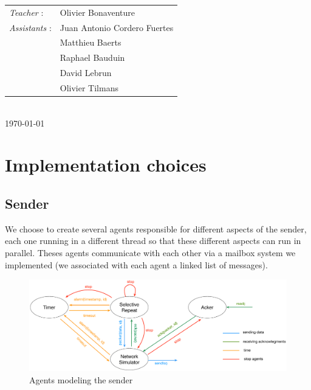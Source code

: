 \documentclass[11pt,a4paper]{article}
\begin{document}
\begin{titlepage}
\normalsize
{\begin{tabular}{ll}
\textit{Teacher} : & Olivier Bonaventure\\
\textit{Assistants} : & Juan Antonio Cordero Fuertes\\
& Matthieu Baerts\\
& Raphael Bauduin\\
& David Lebrun\\
& Olivier Tilmans
\end{tabular}}
\\[1cm]


{\normalsize \today} %

\newpage

\end{titlepage}

%


\section{Implementation choices}

\subsection{Sender}

We choose to create several agents responsible for different aspects of the sender, each one running in a different thread so that these different aspects can run in parallel. Theses agents communicate with each other via a mailbox system we implemented (we associated with each agent a linked list of messages).

\begin{figure}[!h]
	\begin{center}
		\includegraphics[width=18cm]{images/sender.eps}
		\caption{Agents modeling the sender}
		\label{sender}
	\end{center}
\end{figure}
\end{document}
